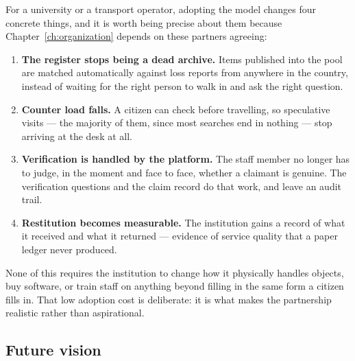 For a university or a transport operator, adopting the model changes four
concrete things, and it is worth being precise about them because
Chapter~\ref{ch:organization} depends on these partners agreeing:

\begin{enumerate}[leftmargin=1.6em,itemsep=3pt]
  \item \textbf{The register stops being a dead archive.} Items published into
        the pool are matched automatically against loss reports from anywhere in
        the country, instead of waiting for the right person to walk in and ask
        the right question.
  \item \textbf{Counter load falls.} A citizen can check before travelling, so
        speculative visits --- the majority of them, since most searches end in
        nothing --- stop arriving at the desk at all.
  \item \textbf{Verification is handled by the platform.} The staff member no
        longer has to judge, in the moment and face to face, whether a claimant
        is genuine. The verification questions and the claim record do that
        work, and leave an audit trail.
  \item \textbf{Restitution becomes measurable.} The institution gains a record
        of what it received and what it returned --- evidence of service
        quality that a paper ledger never produced.
\end{enumerate}

None of this requires the institution to change how it physically handles
objects, buy software, or train staff on anything beyond filling in the same
form a citizen fills in. That low adoption cost is deliberate: it is what makes
the partnership realistic rather than aspirational.

\subsection{Future vision}

